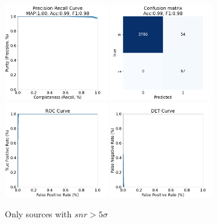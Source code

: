 \documentclass[DM,authoryear,toc]{lsstdoc}
\begin{document}
\begin{figure}[h]
  \centering
  \includegraphics[width=0.4\textwidth]{precrec_13-resnet50-FullAugmentation-scratch-B64__0255000__npy_data_0.1.2-5sigma_256by256__posw_20.png}
  \includegraphics[width=0.4\textwidth]{confmat_13-resnet50-FullAugmentation-scratch-B64__0255000__npy_data_0.1.2-5sigma_256by256__posw_20.png}
  \includegraphics[width=0.4\textwidth]{roc_13-resnet50-FullAugmentation-scratch-B64__0255000__npy_data_0.1.2-5sigma_256by256__posw_20.png}
  \includegraphics[width=0.4\textwidth]{det_13-resnet50-FullAugmentation-scratch-B64__0255000__npy_data_0.1.2-5sigma_256by256__posw_20.png}
  \caption{Only sources with $snr > 5\sigma$}
  \label{fig:tract_templates}
\end{figure}
\end{document}
